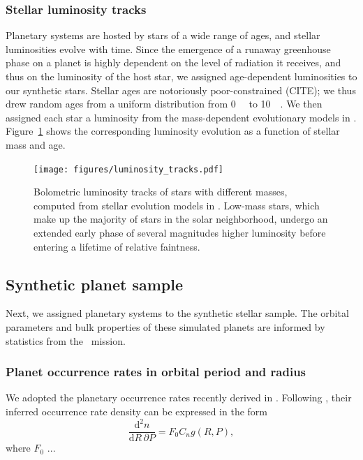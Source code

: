 \documentclass[modern]{aastex631}
\begin{document}
\subsubsection{Stellar luminosity tracks}
    Planetary systems are hosted by stars of a wide range of ages, and stellar luminosities evolve with time.
    Since the emergence of a runaway greenhouse phase on a planet is highly dependent on the level of radiation it receives, and thus on the luminosity of the host star, we assigned age-dependent luminosities to our synthetic stars.
    Stellar ages are notoriously poor-constrained (CITE); we thus drew random ages from a uniform distribution from \SI{0}{\giga\year} to \SI{10}{\giga\year}.
    We then assigned each star a luminosity from the mass-dependent evolutionary models in \citet{Baraffe1998}.
    Figure~\ref{fig:luminosity_tracks} shows the corresponding luminosity evolution as a function of stellar mass and age.
\begin{figure}[ht!]
    \begin{centering}
        \texttt{[image: figures/luminosity\_tracks.pdf]}
        \caption{
            Bolometric luminosity tracks of stars with different masses, computed from stellar evolution models in \citet{Baraffe1998}.
            Low-mass stars, which make up the majority of stars in the solar neighborhood, undergo an extended early phase of several magnitudes higher luminosity before entering a lifetime of relative faintness.
        }
        \label{fig:luminosity_tracks}
    \end{centering}
\end{figure}

\subsection{Synthetic planet sample}\label{sec:syn_planets}
Next, we assigned planetary systems to the synthetic stellar sample.
The orbital parameters and bulk properties of these simulated planets are informed by statistics from the \kepler\ mission.

\subsubsection{Planet occurrence rates in orbital period and radius}
We adopted the planetary occurrence rates recently derived in \citep{Bergsten2022}.
Following \citep{Youdin2011a}, their inferred occurrence rate density can be expressed in the form
\begin{equation}
    \frac{\mathrm{d}^2n}{\mathrm{d}R \, \partial P} = F_0 C_n g(R, P),
\end{equation}
where $F_0$ ...
\end{document}
